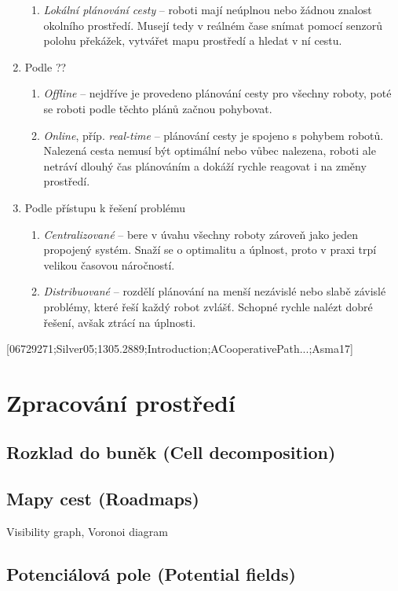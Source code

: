 \begin{enumerate}
\begin{enumerate}
		\item \emph{Lokální plánování cesty} -- roboti mají neúplnou nebo žádnou znalost okolního prostředí. Musejí tedy v reálném čase snímat pomocí senzorů polohu překážek, vytvářet mapu prostředí a hledat v ní cestu.
	\end{enumerate}
	\item Podle ??
	\begin{enumerate}
		\item \emph{Offline} -- nejdříve je provedeno plánování cesty pro všechny roboty, poté se roboti podle těchto plánů začnou pohybovat.
		\item \emph{Online}, příp. \emph{real-time} -- plánování cesty je spojeno s pohybem robotů. Nalezená cesta nemusí být optimální nebo vůbec nalezena, roboti ale netráví dlouhý čas plánováním a dokáží rychle reagovat i na změny prostředí.
	\end{enumerate}
	\item Podle přístupu k řešení problému
	\begin{enumerate}
		\item \emph{Centralizované} -- bere v úvahu všechny roboty zároveň jako jeden propojený systém. Snaží se o optimalitu a úplnost, proto v praxi trpí velikou časovou náročností.
		\item \emph{Distribuované} -- rozdělí plánování na menší nezávislé nebo slabě závislé problémy, které řeší každý robot zvlášť. Schopné rychle nalézt dobré řešení, avšak ztrácí na úplnosti.
	\end{enumerate}
\end{enumerate}
[06729271;Silver05;1305.2889;Introduction;ACooperativePath...;Asma17]

\section{Zpracování prostředí}
\subsection{Rozklad do buněk (Cell decomposition)}
\subsection{Mapy cest (Roadmaps)}
Visibility graph, Voronoi diagram
\subsection{Potenciálová pole (Potential fields)}

